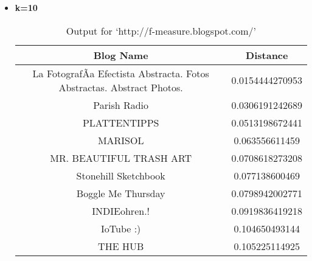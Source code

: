 \begin{itemize}
\item \textbf{ k=10}
\begin{table}
\caption{Output for `http://f-measure.blogspot.com/'}
\label{q1table1}
\begin{center}
\hspace{-2cm}
\begin{tabular}{|c|c|}
\hline
 \textbf{Blog Name} & \textbf{Distance}\\ \hline
La FotografÃ­a Efectista Abstracta. Fotos Abstractas. Abstract  Photos. & 0.0154444270953	 \\ \hline
Parish Radio &    0.0306191242689	  \\ \hline
PLATTENTIPPS &    0.0513198672441	  \\ \hline
MARISOL&  0.063556611459	  \\ \hline
MR. BEAUTIFUL TRASH ART & 0.0708618273208	  \\ \hline
Stonehill Sketchbook  &   0.077138600469	  \\ \hline
Boggle Me Thursday   &    0.0798942002771	  \\ \hline
INDIEohren.! &    0.0919836419218	  \\ \hline
IoTube     :) &   0.104650493144	   \\ \hline
THE HUB & 0.105225114925	  \\ \hline
\end{tabular}
\end{center}
\end{table}


\end{itemize}
